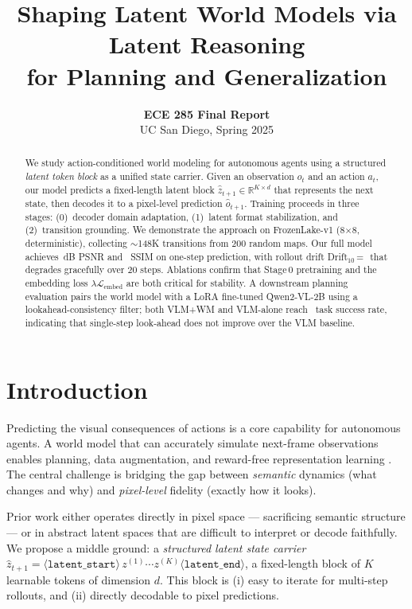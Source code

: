 \documentclass[11pt]{article}
\title{\textbf{Shaping Latent World Models via Latent Reasoning\\
for Planning and Generalization}}
\author{
  \textbf{ECE 285 Final Report}\\
  UC San Diego, Spring 2025
}
\date{}
\begin{document}
\maketitle

\begin{abstract}
We study action-conditioned world modeling for autonomous agents using a structured
\emph{latent token block} as a unified state carrier.
Given an observation $o_t$ and an action $a_t$, our model predicts a fixed-length
latent block $\hat{z}_{t+1} \in \mathbb{R}^{K \times d}$ that represents the
next state, then decodes it to a pixel-level prediction $\hat{o}_{t+1}$.
Training proceeds in three stages: (0)~decoder domain adaptation,
(1)~latent format stabilization, and (2)~transition grounding.
We demonstrate the approach on FrozenLake-v1 (8$\times$8, deterministic),
collecting ${\sim}$148K transitions from 200 random maps.
Our full model achieves \MAINPSNR\,dB PSNR and \MAINSSIM\ SSIM on one-step
prediction, with rollout drift Drift$_{10}$\,=\,\MAINDRIFTX\ that degrades
gracefully over 20 steps.
Ablations confirm that Stage\,0 pretraining and the embedding loss
$\lambda\mathcal{L}_\text{embed}$ are both critical for stability.
A downstream planning evaluation pairs the world model with a LoRA fine-tuned
Qwen2-VL-2B using a lookahead-consistency filter; both VLM+WM and VLM-alone
reach \PLANVLMWMSR\ task success rate, indicating that single-step look-ahead
does not improve over the VLM baseline.
\end{abstract}

\section{Introduction}

Predicting the visual consequences of actions is a core capability for autonomous
agents. A world model that can accurately simulate next-frame observations
enables planning, data augmentation, and reward-free representation learning
\cite{hafner2019dream,ha2018world}.
The central challenge is bridging the gap between \emph{semantic} dynamics
(what changes and why) and \emph{pixel-level} fidelity (exactly how it looks).

Prior work either operates directly in pixel space \cite{oh2015action} ---
sacrificing semantic structure --- or in abstract latent spaces \cite{hafner2020mastering}
that are difficult to interpret or decode faithfully.
We propose a middle ground: a \emph{structured latent state carrier}
$\hat{z}_{t+1} = \langle\texttt{latent\_start}\rangle\, z^{(1)}\cdots z^{(K)}
\langle\texttt{latent\_end}\rangle$,
a fixed-length block of $K$ learnable tokens of dimension $d$.
This block is (i) easy to iterate for multi-step rollouts, and
(ii) directly decodable to pixel predictions.
\end{document}
